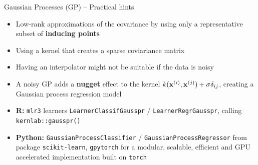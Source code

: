 \begin{frame}{Gaussian Processes (GP) -- Practical hints}

\begin{itemize}
	\item Low-rank approximations of the covariance by using only a representative subset of \textbf{inducing points}
	\item Using a kernel that creates a sparse coviariance matrix
\end{itemize}

\medskip

\begin{itemize}
    \item Having an interpolator might not be suitable if the data is noisy
    \item A noisy GP adds a \textbf{nugget} effect to the kernel $k(\mathbf{x}^{(i)}, \mathbf{x}^{(j)}) + \sigma\delta_{ij}$, creating a Gaussian process regression model
\end{itemize}

\medskip


\begin{itemize}
  \item \textbf{R:} \texttt{mlr3} learners \texttt{LearnerClassifGausspr} /
    \texttt{LearnerRegrGausspr}, calling \texttt{kernlab::gausspr()}
  \item \textbf{Python:} \texttt{GaussianProcessClassifier} /
  \texttt{GaussianProcessRegressor} from package \texttt{scikit-learn}, \texttt{gpytorch} for a modular, scalable, efficient and GPU accelerated implementation built on \texttt{torch}
\end{itemize}

\end{frame}

